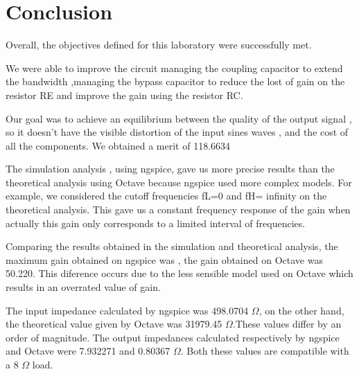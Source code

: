 \section{Conclusion}
\label{sec:conclusion}


Overall, the objectives defined for this laboratory were successfully met.


We were able to improve the circuit managing the coupling capacitor to extend the bandwidth ,managing the bypass capacitor to reduce the lost of gain on the resistor RE and improve the gain using the resistor RC.



Our goal was to achieve an equilibrium between the quality of the output signal , so it doesn't have the visible distortion of the input sines waves , and the cost of all the components. We obtained a merit of 118.6634



The simulation analysis , using ngspice, gave us more precise results than the theoretical analysis using Octave because ngspice used more complex models. For example, we considered the cutoff frequencies fL=0 and fH= infinity on the theoretical analysis. This gave us a constant frequency response of the gain when actually this gain only corresponds to a limited interval of frequencies. 


Comparing the results obtained in the simulation and theoretical analysis, the maximum gain obtained on ngspice was , the gain obtained on Octave was 50.220. This diference occurs due to the less sensible model used on Octave which results  in an overrated value of gain. 


The input impedance calculated by ngspice was 498.0704 $\Omega$, on the other hand, the theoretical value  given by Octave was 31979.45 $\Omega$.These values differ by an order of magnitude. The output impedances calculated respectively by ngspice and Octave were 7.932271 and 0.80367 $\Omega$. Both these values are compatible with a 8 $\Omega$ load. 


